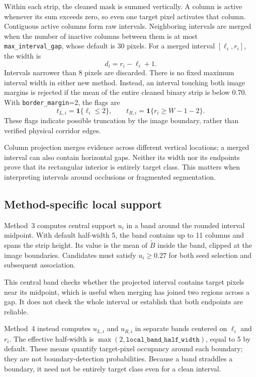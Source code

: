 Within each strip, the cleaned mask is summed vertically. A column is
active whenever its sum exceeds zero, so even one target pixel activates
that column. Contiguous active columns form raw intervals. Neighboring
intervals are merged when the number of inactive columns between them
is at most \texttt{max\_interval\_gap}, whose default is 30 pixels.
For a merged interval $[\ell_i,r_i]$, the width is
\begin{equation}
    d_i=r_i-\ell_i+1.
    \label{eq:c4_interval}
\end{equation}
Intervals narrower than 8 pixels are discarded. There is no fixed maximum
interval width in either new method. Instead, an interval touching both
image margins is rejected if the mean of the entire cleaned binary strip
is below 0.70. With \texttt{border\_margin}=2, the flags are
\begin{equation}
    t_{L,i}=\mathbf{1}\{\ell_i\leq2\},\qquad
    t_{R,i}=\mathbf{1}\{r_i\geq W-1-2\}.
\end{equation}
These flags indicate possible truncation by the image boundary, rather
than verified physical corridor edges.

Column projection merges evidence across different vertical locations;
a merged interval can also contain horizontal gaps. Neither its width
nor its endpoints prove that its rectangular interior is entirely target
class. This matters when interpreting intervals around occlusions or
fragmented segmentation.

\subsection{Method-specific local support}
\label{subsec:c4_support}

Method~3 computes central support $u_i$ in a band around the rounded
interval midpoint. With default half-width 5, the band contains up to
11 columns and spans the strip height. Its value is the mean of
$\widetilde B$ inside the band, clipped at the image boundaries.
Candidates must satisfy $u_i\geq0.27$ for both seed selection and
subsequent association.

This central band checks whether the projected interval contains target
pixels near its midpoint, which is useful when merging has joined two
regions across a gap. It does not check the whole interval or establish
that both endpoints are reliable.

Method~4 instead computes $u_{L,i}$ and $u_{R,i}$ in separate bands
centered on $\ell_i$ and $r_i$. The effective half-width is
$\max(2,\texttt{local\_band\_half\_width})$, equal to 5 by default.
These means quantify target-pixel occupancy around each boundary; they
are not boundary-detection probabilities. Because a band straddles a
boundary, it need not be entirely target class even for a clean interval.

